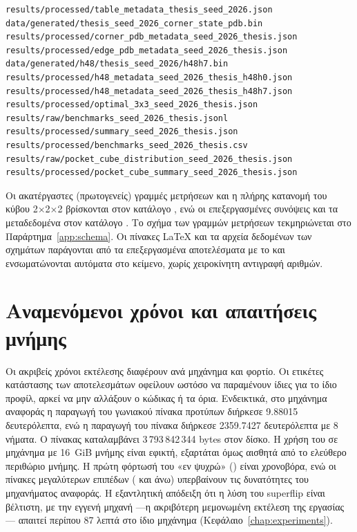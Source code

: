 \begin{verbatim}
results/processed/table_metadata_thesis_seed_2026.json
data/generated/thesis_seed_2026_corner_state_pdb.bin
results/processed/corner_pdb_metadata_seed_2026_thesis.json
results/processed/edge_pdb_metadata_seed_2026_thesis.json
data/generated/h48/thesis_seed_2026/h48h7.bin
results/processed/h48_metadata_seed_2026_thesis_h48h0.json
results/processed/h48_metadata_seed_2026_thesis_h48h7.json
results/processed/optimal_3x3_seed_2026_thesis.json
results/raw/benchmarks_seed_2026_thesis.jsonl
results/processed/summary_seed_2026_thesis.json
results/processed/benchmarks_seed_2026_thesis.csv
results/raw/pocket_cube_distribution_seed_2026_thesis.json
results/processed/pocket_cube_summary_seed_2026_thesis.json
\end{verbatim}

Οι ακατέργαστες (πρωτογενείς) γραμμές μετρήσεων και η πλήρης κατανομή του κύβου 2×2×2 βρίσκονται στον κατάλογο , ενώ οι επεξεργασμένες συνόψεις και τα μεταδεδομένα στον κατάλογο . Το σχήμα των γραμμών μετρήσεων τεκμηριώνεται στο Παράρτημα~\ref{app:schema}. Οι πίνακες LaTeX και τα αρχεία δεδομένων των σχημάτων παράγονται από τα επεξεργασμένα αποτελέσματα με το  και ενσωματώνονται αυτόματα στο κείμενο, χωρίς χειροκίνητη αντιγραφή αριθμών.

\section{Αναμενόμενοι χρόνοι και απαιτήσεις μνήμης}
\label{sec:repro-cost}

Οι ακριβείς χρόνοι εκτέλεσης διαφέρουν ανά μηχάνημα και φορτίο. Οι ετικέτες κατάστασης των αποτελεσμάτων οφείλουν ωστόσο να παραμένουν ίδιες για το ίδιο προφίλ, αρκεί να μην αλλάξουν ο κώδικας ή τα όρια. Ενδεικτικά, στο μηχάνημα αναφοράς η παραγωγή του γωνιακού πίνακα προτύπων διήρκεσε 9.88015 δευτερόλεπτα, ενώ η παραγωγή του πίνακα  διήρκεσε 2359.7427 δευτερόλεπτα με 8 νήματα. Ο πίνακας  καταλαμβάνει 3\,793\,842\,344 bytes στον δίσκο. Η χρήση του σε μηχάνημα με 16~GiB μνήμης είναι εφικτή, εξαρτάται όμως αισθητά από το ελεύθερο περιθώριο μνήμης. Η πρώτη φόρτωσή του «εν ψυχρώ» () είναι χρονοβόρα, ενώ οι πίνακες μεγαλύτερων επιπέδων ( και άνω) υπερβαίνουν τις δυνατότητες του μηχανήματος αναφοράς. Η εξαντλητική απόδειξη ότι η λύση του superflip είναι βέλτιστη, με την εγγενή μηχανή —η ακριβότερη μεμονωμένη εκτέλεση της εργασίας— απαιτεί περίπου 87 λεπτά στο ίδιο μηχάνημα (Κεφάλαιο~\ref{chap:experiments}).

